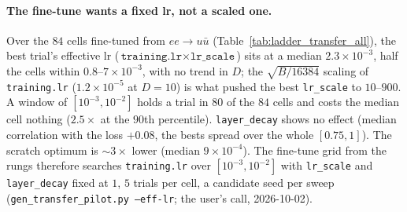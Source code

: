 \documentclass[11pt]{article}
\newcommand{\code}[1]{\texttt{#1}}
\begin{document}
\paragraph{The fine-tune wants a fixed lr, not a scaled one.} Over the $84$ cells fine-tuned from $ee\to u\bar u$
(Table~\ref{tab:ladder_transfer_all}), the best trial's effective lr ($\code{training.lr}\times\code{lr\_scale}$) sits
at a median $2.3\times10^{-3}$, half the cells within $0.8$--$7\times10^{-3}$, with no trend in $D$; the
$\sqrt{B/16384}$ scaling of \code{training.lr} ($1.2\times10^{-5}$ at $D=10$) is what pushed the best \code{lr\_scale} to
$10$--$900$. A window of $[10^{-3},10^{-2}]$ holds a trial in $80$ of the $84$ cells and costs the median cell nothing
($2.5\times$ at the $90$th percentile). \code{layer\_decay} shows no effect (median correlation with the loss $+0.08$,
the bests spread over the whole $[0.75,1]$). The scratch optimum is $\sim3\times$ lower (median $9\times10^{-4}$). The
fine-tune grid from the rungs therefore searches \code{training.lr} over $[10^{-3},10^{-2}]$ with \code{lr\_scale} and
\code{layer\_decay} fixed at $1$, $5$ trials per cell, a candidate seed per sweep (\code{gen\_transfer\_pilot.py --eff-lr};
the user's call, 2026-10-02).
\end{document}
